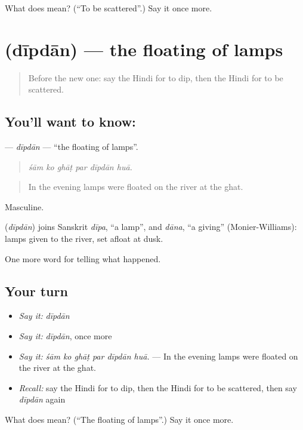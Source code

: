 \begin{tcolorbox}[breakable,colback=teal!4,colframe=teal!35!black,title={Before you move on}]
What does  mean? (\textquotedblleft{}To be scattered\textquotedblright{}.) Say it once more.
\end{tcolorbox}
\section[\texorpdfstring{\hi{दीपदान} (dīpdān)}{दीपदान (dīpdān)}]{ (dīpdān) — the floating of lamps}

\label{lesson:HI-C333-dipdan}



\begin{quote}
Before the new one: say the Hindi for to dip, then the Hindi for to be scattered.
\end{quote}

\subsection*{You'll want to know: }
\textbf{} — \emph{dīpdān} — \textquotedblleft{}the floating of lamps\textquotedblright{}.

\begin{quote}
     
\end{quote}

\begin{quote}
\emph{śām ko ghāṭ par dīpdān huā.}
\end{quote}

\begin{quote}
In the evening lamps were floated on the river at the ghat.
\end{quote}

Masculine.

\begin{cousinweb}
\textbf{} (\emph{dīpdān}) joins Sanskrit \emph{dīpa}, \textquotedblleft{}a lamp\textquotedblright{}, and \emph{dāna}, \textquotedblleft{}a giving\textquotedblright{} (Monier-Williams): lamps given to the river, set afloat at dusk.
\end{cousinweb}

\begin{grammarlens}[title={What you've built}]
One more word for telling what happened.
\end{grammarlens}

\subsection*{Your turn}
\begin{itemize}
\raggedright
  \item \emph{Say it:} \emph{dīpdān}
  \item \emph{Say it:} \emph{dīpdān}, once more
  \item \emph{Say it:} \emph{śām ko ghāṭ par dīpdān huā.} — In the evening lamps were floated on the river at the ghat.
  \item \emph{Recall:} say the Hindi for to dip, then the Hindi for to be scattered, then say \emph{dīpdān} again
\end{itemize}

\begin{tcolorbox}[breakable,colback=teal!4,colframe=teal!35!black,title={Before you move on}]
What does  mean? (\textquotedblleft{}The floating of lamps\textquotedblright{}.) Say it once more.
\end{tcolorbox}
